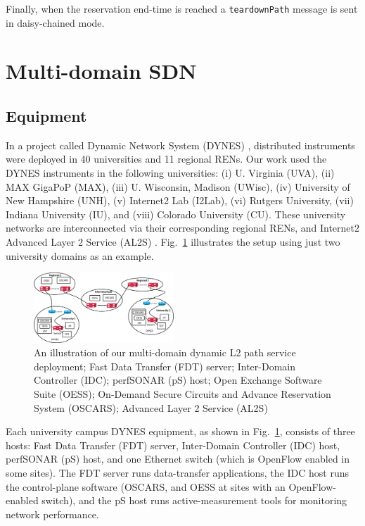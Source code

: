 {Finally, when the reservation end-time is reached a \texttt{teardownPath} message is sent in daisy-chained mode.



\section{Multi-domain SDN}
\label{sec:mdsdn}
\subsection{Equipment}
In a project called Dynamic Network System (DYNES) \cite{1742-6596-396-4-042065}, distributed instruments were deployed in 40 universities and 11 regional RENs. Our work
used the DYNES instruments in the following universities:
(i) U. Virginia (UVA), (ii) MAX GigaPoP (MAX), (iii) U. Wisconsin, Madison (UWisc), (iv) University of New Hampshire (UNH), (v) Internet2 Lab (I2Lab), (vi) Rutgers University,  (vii) Indiana University (IU), and (viii) Colorado University (CU). These university
networks are interconnected via their corresponding regional RENs, and Internet2 Advanced Layer 2 Service (AL2S) \cite{AL2S}. Fig.~\ref{fig:network} illustrates the setup using just two university domains as an example.
\begin{figure}
\centering               \includegraphics[width=0.47\textwidth]{figures/multi-domain-network.png}
\caption{An illustration of our multi-domain dynamic L2 path service deployment; Fast Data Transfer (FDT) server; Inter-Domain Controller (IDC); perfSONAR (pS) host; Open Exchange Software Suite (OESS); On-Demand Secure Circuits and Advance Reservation System (OSCARS); Advanced Layer 2 Service (AL2S)}
\label{fig:network}
\end{figure}

Each university
campus DYNES equipment, as shown in Fig.~\ref{fig:network},
consists of three hosts: Fast Data Transfer (FDT) server, Inter-Domain Controller (IDC) host, perfSONAR (pS) \cite{perfSONAR} host,
and one Ethernet switch (which is OpenFlow enabled in some sites). The FDT server runs data-transfer applications, the IDC host runs the control-plane software (OSCARS, and OESS at sites with an OpenFlow-enabled switch), and the pS host runs active-measurement tools for monitoring network performance.

}

